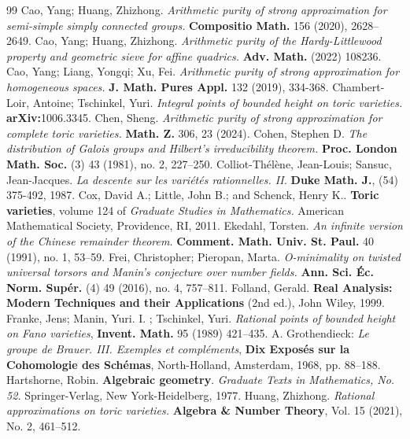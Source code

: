\begin{thebibliography}{99}
	 Cao, Yang; Huang, Zhizhong. \emph{Arithmetic purity of strong approximation for semi-simple simply connected groups.}	\textbf{Compositio Math.} 156 (2020), 2628--2649. 
	 Cao, Yang; Huang, Zhizhong. \emph{Arithmetic purity of the Hardy-Littlewood property and geometric sieve for affine quadrics.} \textbf{Adv. Math.} (2022) 108236.
	 Cao, Yang; Liang, Yongqi; Xu, Fei. \emph{Arithmetic purity of strong approximation for homogeneous spaces.} \textbf{J. Math. Pures Appl.} 132 (2019), 334-368.
	 Chambert-Loir, Antoine; Tschinkel, Yuri. \emph{Integral points of bounded height on toric varieties.} \textbf{arXiv:}1006.3345.
	 Chen, Sheng. {\em Arithmetic purity of strong approximation for complete toric varieties.} \textbf{Math. Z.} 306, 23 (2024).
	 Cohen, Stephen D. \emph{The distribution of Galois groups and Hilbert's irreducibility theorem.} \textbf{Proc. London Math. Soc.} (3) 43 (1981), no. 2, 227--250.
	  Colliot-Thél\`ene, Jean-Louis;  Sansuc, Jean-Jacques. \emph{La descente sur les variétés rationnelles. II.}  \textbf{Duke Math. J.}, (54) 375-492, 1987.
	  Cox, David A.; Little, John B.; and Schenck, Henry K.. \textbf{Toric varieties}, volume 124 of \emph{Graduate Studies in Mathematics.} American Mathematical Society, Providence, RI, 2011.
	 Ekedahl, Torsten. \emph{An infinite version of the Chinese remainder theorem.} \textbf{Comment. Math. Univ. St. Paul.} 40 (1991), no. 1, 53--59.
	 Frei, Christopher; Pieropan, Marta. \emph{O-minimality on twisted universal torsors and Manin's conjecture over number fields.} \textbf{Ann. Sci. Éc. Norm. Supér.} (4) 49 (2016), no. 4, 757--811. 
	 Folland, Gerald. \textbf{Real Analysis: Modern Techniques and their Applications} (2nd ed.), John Wiley, 1999.
	 Franke, Jens; Manin,  Yuri. I. ; Tschinkel, Yuri. \emph{Rational points of bounded height on Fano
	varieties}, \textbf{Invent. Math.} 95 (1989) 421--435.
 A. Grothendieck: \emph{Le groupe de Brauer. III. Exemples et compléments}, \textbf{Dix Exposés sur la Cohomologie des Schémas}, North-Holland, Amsterdam, 1968, pp. 88--188.
	  Hartshorne, Robin. \textbf{Algebraic geometry}. \emph{Graduate Texts in Mathematics, No. 52.} Springer-Verlag, New York-Heidelberg, 1977. 
	 Huang, Zhizhong. \emph{Rational approximations on toric varieties.} \textbf{Algebra \& Number Theory}, Vol. 15 (2021), No. 2, 461--512.

\end{thebibliography}
